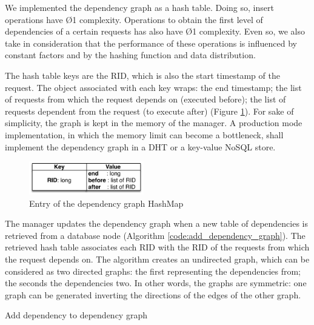 We implemented the dependency graph as a hash table. Doing so, insert operations have \O{1} complexity. Operations to obtain the first level of dependencies of a certain requests has also have \O{1} complexity. Even so, we also take in consideration that the performance of these operations is influenced by constant factors and by the hashing function and data distribution.

The hash table keys are the \ac{RID}, which is also the start timestamp of the request. The object associated with each key wraps: the end timestamp; the list of requests from which the request depends on (executed before); the list of requests dependent from the request (to execute after) (Figure \ref{fig:impl:manager:graph}). For sake of simplicity, the graph is kept in the memory of the manager. A production mode implementation, in which the memory limit can become a bottleneck, shall implement the dependency graph in a \ac{DHT} or a key-value \acs{NoSQL} store.


\begin{figure}
  \centering
  \includegraphics[width=50mm]{arch/managerGraph}
  \caption{Entry of the dependency graph HashMap}
  \label{fig:impl:manager:graph}
\end{figure}


The manager updates the dependency graph when a new table of dependencies is retrieved from a database node (Algorithm \ref{code:add_dependency_graph}). The retrieved hash table associates each \ac{RID} with the \ac{RID} of the requests from which the request depends on. The algorithm creates an undirected graph, which can be considered as two directed graphs: the first representing the dependencies from; the seconds the dependencies two. In other words, the graphs are symmetric: one graph can be generated inverting the directions of the edges of the other graph.\\

 \begin{algorithm}[H]
 \DontPrintSemicolon{}
 	\;
 	\BlankLine
 	\caption{Add dependency to dependency graph}
	\label{code:add_dependency_graph}
\end{algorithm}

